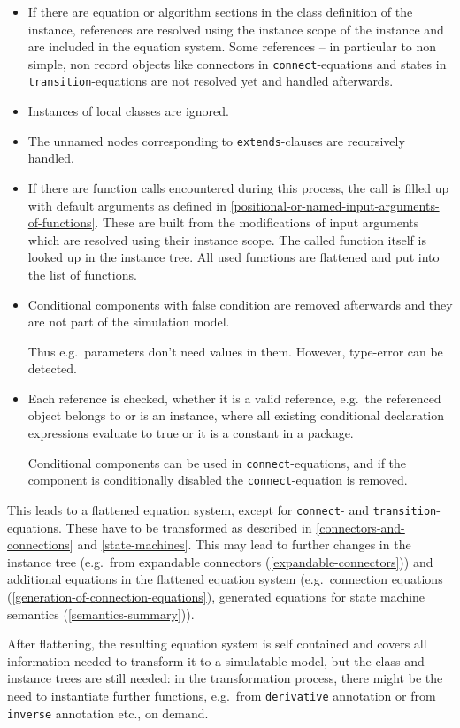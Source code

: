 \begin{itemize}
\begin{itemize}
  \end{itemize}
\item
  If there are equation or algorithm sections in the class definition of the instance, references are resolved using the instance scope of the instance and are included in the equation system.
  Some references -- in particular to non simple, non record objects like connectors in \lstinline!connect!-equations and states in \lstinline!transition!-equations are not resolved yet and handled afterwards.
\item
  Instances of local classes are ignored.
\item
  The unnamed nodes corresponding to \lstinline!extends!-clauses are recursively handled.
\item
  If there are function calls encountered during this process, the call is filled up with default arguments as defined in \cref{positional-or-named-input-arguments-of-functions}.
  These are built from the modifications of input arguments which are resolved using their instance scope.
  The called function itself is looked up in the instance tree.
  All used functions are flattened and put into the list of functions.
\item
  Conditional components with false condition are removed afterwards and they are not part of the simulation model.
  \begin{nonnormative}
  Thus e.g.\ parameters don't need values in them.
  However, type-error can be detected.
  \end{nonnormative}
\item
  Each reference is checked, whether it is a valid reference, e.g.\ the referenced object belongs to or is an instance, where all existing conditional declaration expressions evaluate to true or it is a constant in a package.
  \begin{nonnormative}
  Conditional components can be used in \lstinline!connect!-equations, and if the component is conditionally disabled the \lstinline!connect!-equation is removed.
  \end{nonnormative}
\end{itemize}

This leads to a flattened equation system, except for \lstinline!connect!- and \lstinline!transition!-equations.
These have to be transformed as described in \cref{connectors-and-connections} and \cref{state-machines}.
This may lead to further changes in the instance tree (e.g.\ from expandable connectors (\cref{expandable-connectors})) and additional equations in the flattened equation system (e.g.\ connection equations (\cref{generation-of-connection-equations}), generated equations for state machine semantics (\cref{semantics-summary})).

\begin{nonnormative}
After flattening, the resulting equation system is self contained and covers all information needed to transform it to a simulatable model, but the class and instance trees are still needed: in the transformation process, there might be the need to instantiate further functions, e.g.\ from \lstinline!derivative! annotation or from \lstinline!inverse! annotation etc., on demand.
\end{nonnormative}
